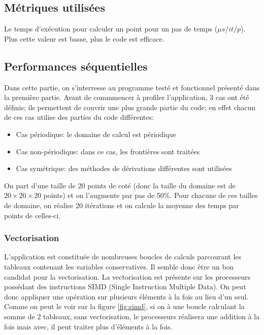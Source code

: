 \subsection{Métriques utilisées}
Le temps d'exécution pour calculer un point pour un pas de temps ($\mu s/it/p$). Plus cette valeur est basse, plus le code est efficace. 

\subsection{Performances séquentielles}
Dans cette partie, on s'interresse au programme testé et fonctionnel présenté dans la première partie. Avant de commmencer à profiler l'application, 3 cas ont été définis; ils permettent de couvrir une plus grande partie du code; en effet chacun de ces cas utilise des parties du code différentes:
\begin{itemize}
\item Cas périodique: le domaine de calcul est périodique
\item Cas non-périodique: dans ce cas, les frontières sont traitées
\item Cas symétrique: des méthodes de dérivations différentes sont utilisées
\end{itemize}

On part d'une taille de 20 points de coté (donc la taille du domaine est de $20\times20\times20$ points) et on l'augmente par pas de 50\%. Pour chacune de ces tailles de domaine, on réalise 20 itérations et on calcule la moyenne des temps par points de celles-ci.


\subsubsection{Vectorisation}
L'application est constituée de nombreuses boucles de calculs parcourant les tableaux contenant les variables conservatives. Il semble donc être un bon candidat pour la vectorisation. La vectorisation est présente sur les processeurs possédant des instructions SIMD (Single Instruction Multiple Data). On peut donc appliquer une opération sur plusieurs éléments à la fois au lieu d'un seul. Comme on peut le voir sur la figure \ref{fig:simd}, si on à une boucle calculant la somme de 2 tableaux, sans vectorisation, le processeurs réalisera une addition à la fois mais avec, il peut traiter plus d'éléments à la fois.


